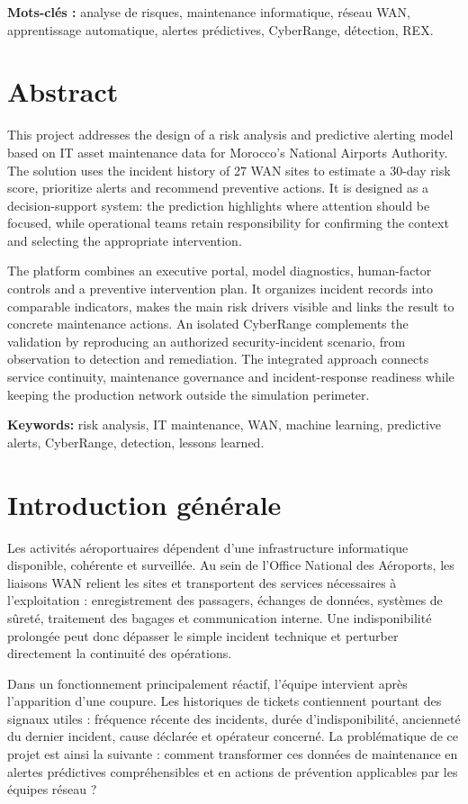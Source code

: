 \documentclass[12pt,a4paper,oneside]{report}
\newcommand{\frontchapter}[1]{%
  \chapter*{#1}%
  \addcontentsline{toc}{chapter}{#1}%
}
\begin{document}
\textbf{Mots-clés :} analyse de risques, maintenance informatique, réseau WAN, apprentissage automatique, alertes prédictives, CyberRange, détection, REX.

\frontchapter{Abstract}
This project addresses the design of a risk analysis and predictive alerting model based on IT asset maintenance data for Morocco’s National Airports Authority. The solution uses the incident history of 27 WAN sites to estimate a 30-day risk score, prioritize alerts and recommend preventive actions. It is designed as a decision-support system: the prediction highlights where attention should be focused, while operational teams retain responsibility for confirming the context and selecting the appropriate intervention.

The platform combines an executive portal, model diagnostics, human-factor controls and a preventive intervention plan. It organizes incident records into comparable indicators, makes the main risk drivers visible and links the result to concrete maintenance actions. An isolated CyberRange complements the validation by reproducing an authorized security-incident scenario, from observation to detection and remediation. The integrated approach connects service continuity, maintenance governance and incident-response readiness while keeping the production network outside the simulation perimeter.

\textbf{Keywords:} risk analysis, IT maintenance, WAN, machine learning, predictive alerts, CyberRange, detection, lessons learned.

\tableofcontents
\clearpage
\renewcommand{\listfigurename}{Table des figures}
\listoffigures
\clearpage
\listoftables

\clearpage
{}
\setcounter{page}{1}

\frontchapter{Introduction générale}

Les activités aéroportuaires dépendent d’une infrastructure informatique disponible, cohérente et surveillée. Au sein de l’Office National des Aéroports, les liaisons WAN relient les sites et transportent des services nécessaires à l’exploitation : enregistrement des passagers, échanges de données, systèmes de sûreté, traitement des bagages et communication interne. Une indisponibilité prolongée peut donc dépasser le simple incident technique et perturber directement la continuité des opérations.

Dans un fonctionnement principalement réactif, l’équipe intervient après l’apparition d’une coupure. Les historiques de tickets contiennent pourtant des signaux utiles : fréquence récente des incidents, durée d’indisponibilité, ancienneté du dernier incident, cause déclarée et opérateur concerné. La problématique de ce projet est ainsi la suivante : comment transformer ces données de maintenance en alertes prédictives compréhensibles et en actions de prévention applicables par les équipes réseau ?
\end{document}
